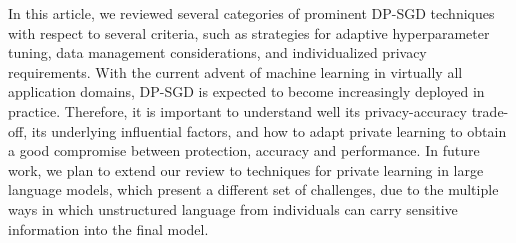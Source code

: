 \documentclass[11pt]{article}
\begin{document}
In this article, we reviewed several categories of prominent DP-SGD techniques with respect to several criteria, such as strategies for adaptive hyperparameter tuning, data management considerations, and individualized privacy requirements. With the current advent of machine learning in virtually all application domains, DP-SGD is expected to become increasingly deployed in practice. Therefore, it is important to understand well its privacy-accuracy trade-off, its underlying influential factors, and how to adapt private learning to obtain a good compromise between protection, accuracy and performance. In future work, we plan to extend our review to techniques for private learning in large language models, which present a different set of challenges, due to the multiple ways in which unstructured language from individuals can carry sensitive information into the final model.













\end{document}
